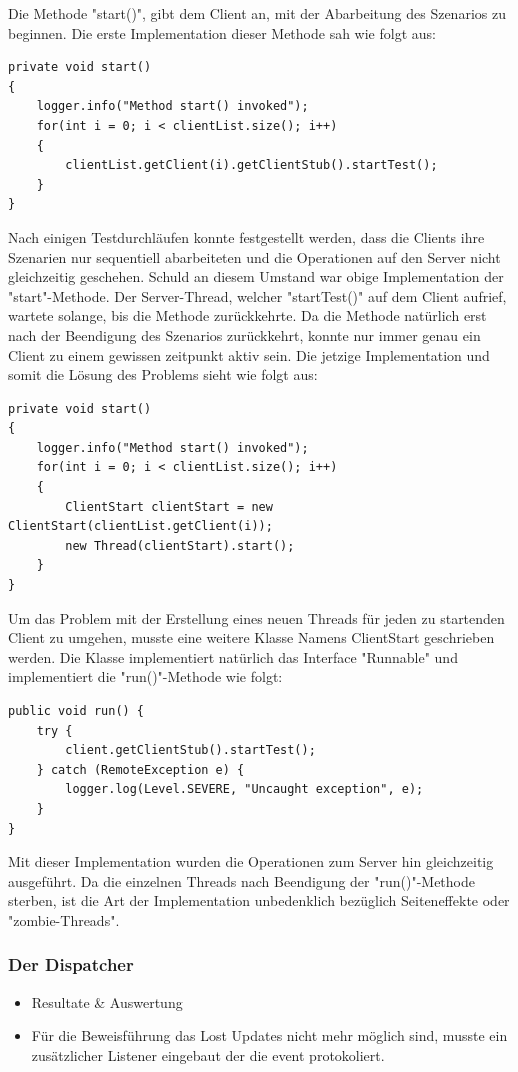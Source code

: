 Die Methode "start()", gibt dem Client an, mit der Abarbeitung des Szenarios zu beginnen. Die erste Implementation dieser Methode sah wie folgt aus:
\begin{lstlisting}
private void start()
{
	logger.info("Method start() invoked");
	for(int i = 0; i < clientList.size(); i++)
	{
		clientList.getClient(i).getClientStub().startTest();
	}
}
\end{lstlisting}

Nach einigen Testdurchläufen konnte festgestellt werden, dass die Clients ihre Szenarien nur sequentiell abarbeiteten und die Operationen auf den Server nicht gleichzeitig geschehen. Schuld an diesem Umstand war obige Implementation der "start"-Methode. Der Server-Thread, welcher "startTest()" auf dem Client aufrief, wartete solange, bis die Methode zurückkehrte. Da die Methode natürlich erst nach der Beendigung des Szenarios zurückkehrt, konnte nur immer genau ein Client zu einem gewissen zeitpunkt aktiv sein.\newline
Die jetzige Implementation und somit die Lösung des Problems sieht wie folgt aus:
\begin{lstlisting}
private void start()
{
	logger.info("Method start() invoked");
	for(int i = 0; i < clientList.size(); i++)
	{
		ClientStart clientStart = new ClientStart(clientList.getClient(i));
		new Thread(clientStart).start();
	}
}
\end{lstlisting}
Um das Problem mit der Erstellung eines neuen Threads für jeden zu startenden Client zu umgehen, musste eine weitere Klasse Namens ClientStart geschrieben werden. Die Klasse implementiert natürlich das Interface "Runnable" und implementiert die "run()"-Methode wie folgt:
\begin{lstlisting}
public void run() {
	try {
		client.getClientStub().startTest();
	} catch (RemoteException e) {
		logger.log(Level.SEVERE, "Uncaught exception", e);
	}
}
\end{lstlisting}

Mit dieser Implementation wurden die Operationen zum Server hin gleichzeitig ausgeführt. Da die einzelnen Threads nach Beendigung der "run()"-Methode sterben, ist die Art der Implementation unbedenklich bezüglich Seiteneffekte oder "zombie-Threads".

\subsubsection{Der Dispatcher}
\label{sec:dispatcher}


\begin{itemize}	

\item Resultate \& Auswertung
\item Für die Beweisführung das Lost Updates nicht mehr möglich sind, musste ein zusätzlicher Listener eingebaut der die event protokoliert.
\end{itemize}

